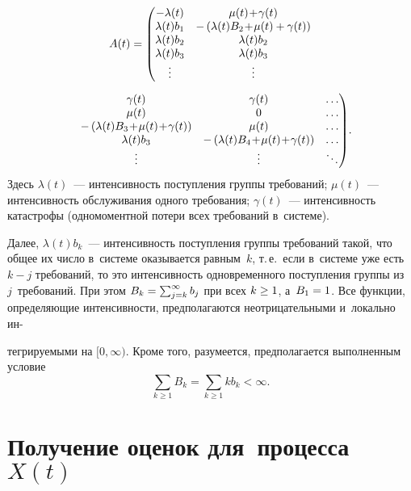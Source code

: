 \begin{multicols}{2}
\noindent
\begin{multline*}
A(t) =\left(
\begin{matrix}
-\lambda(t) & \mu(t) \!+\! \gamma(t) \\
\la(t)b_1 & - \left (\lambda(t)B_2 \!+\! \mu(t) + \gamma(t) \right )  \\
\la(t)b_2& \la(t)b_2  \\
\la(t)b_3 & \la(t)b_3  \\
\vdots& \vdots \\
\end{matrix}\right.\\[6pt]
\left.
\begin{matrix}
  \gamma(t) &  \gamma(t)&\ldots \\
    \mu(t)&0&\ldots\\
- \left ( \lambda(t)B_3 \!+\! \mu(t) \!+\! \gamma(t) \right )   &        \mu(t)&\ldots\\
 \la(t)b_3      &  - \left ( \lambda(t)B_4 \!+\! \mu(t) \!+\! \gamma(t) \right )&\ldots  \\
       \vdots &   \vdots &\ddots 
       \end{matrix}
     \right)\!.\hspace*{-8.6pt}
\end{multline*}
Здесь $\lambda(t)$~--- интенсивность поступления группы требований; $\mu(t)$~--- 
интенсивность обслуживания одного требования; $\gamma(t)$~--- интенсивность катастрофы 
(одномоментной потери всех требований в~сис\-те\-ме). 

Далее, $\lambda(t)b_k$~--- 
интенсивность поступления группы требований такой, что общее их число в~сис\-те\-ме 
оказывается равным~$k$, т.\,е.\ если в~сис\-те\-ме уже есть $k-j$ требований, 
то это  интенсивность одновременного поступления группы из~$j$~требований. При этом 
$B_k\hm=\sum\nolimits_{j=k}^{\infty}b_j$ при всех $k \hm\ge 1$, а~$B_1\hm=1$. 
Все функции, определяющие интенсивности, предполагаются неотрицательными и~локально 
ин-\linebreak\vspace*{-12pt}

\pagebreak

\noindent
тегрируемыми на $[0,\infty)$.
Кроме того, разумеется, предполагается выполненным условие
\begin{equation}
\sum_{k \ge 1} B_k = \sum\limits_{k \ge 1} k b_k < \infty. 
\label{tail01}
\end{equation}


\section{Получение оценок для~процесса~$X(t)$}


\end{multicols}
